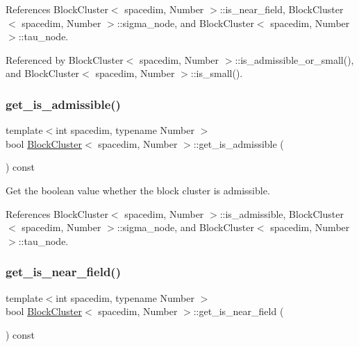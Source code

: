 References Block\+Cluster$<$ spacedim, Number $>$\+::is\+\_\+near\+\_\+field, Block\+Cluster$<$ spacedim, Number $>$\+::sigma\+\_\+node, and Block\+Cluster$<$ spacedim, Number $>$\+::tau\+\_\+node.



Referenced by Block\+Cluster$<$ spacedim, Number $>$\+::is\+\_\+admissible\+\_\+or\+\_\+small(), and Block\+Cluster$<$ spacedim, Number $>$\+::is\+\_\+small().

\mbox{\label{classBlockCluster_a792554d843db2dfb996a1d1086e9178b}} 
\subsubsection{\texorpdfstring{get\+\_\+is\+\_\+admissible()}{get\_is\_admissible()}}
{\footnotesize\ttfamily template$<$int spacedim, typename Number $>$ \\
bool \hyperlink{classBlockCluster}{Block\+Cluster}$<$ spacedim, Number $>$\+::get\+\_\+is\+\_\+admissible (\begin{DoxyParamCaption}{ }\end{DoxyParamCaption}) const}

Get the boolean value whether the block cluster is admissible. 

References Block\+Cluster$<$ spacedim, Number $>$\+::is\+\_\+admissible, Block\+Cluster$<$ spacedim, Number $>$\+::sigma\+\_\+node, and Block\+Cluster$<$ spacedim, Number $>$\+::tau\+\_\+node.

\mbox{\label{classBlockCluster_ac263721e28921a6177a025139745fe8d}} 
\subsubsection{\texorpdfstring{get\+\_\+is\+\_\+near\+\_\+field()}{get\_is\_near\_field()}}
{\footnotesize\ttfamily template$<$int spacedim, typename Number $>$ \\
bool \hyperlink{classBlockCluster}{Block\+Cluster}$<$ spacedim, Number $>$\+::get\+\_\+is\+\_\+near\+\_\+field (\begin{DoxyParamCaption}{ }\end{DoxyParamCaption}) const}

